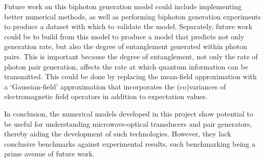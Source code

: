 Future work on this biphoton generation model could include implementing better numerical methods, as well as performing biphoton generation experiments to produce a dataset with which to validate the model. Separately, future work could be to build from this model to produce a model that predicts not only generation rate, but also the degree of entanglement generated within photon pairs. This is important because the degree of entanglement, not only the rate of photon pair generation, affects the rate at which quantum information can be transmitted. This could be done by replacing the mean-field approximation with a `Gaussian-field' approximation that incorporates the (co)variances of electromagnetic field operators in addition to expectation values.

In conclusion, the numerical models developed in this project show potential to be useful for understanding microwave-optical transducers and pair generators, thereby aiding the development of such technologies. However, they lack conclusive benchmarks against experimental results, such benchmarking being a prime avenue of future work.
